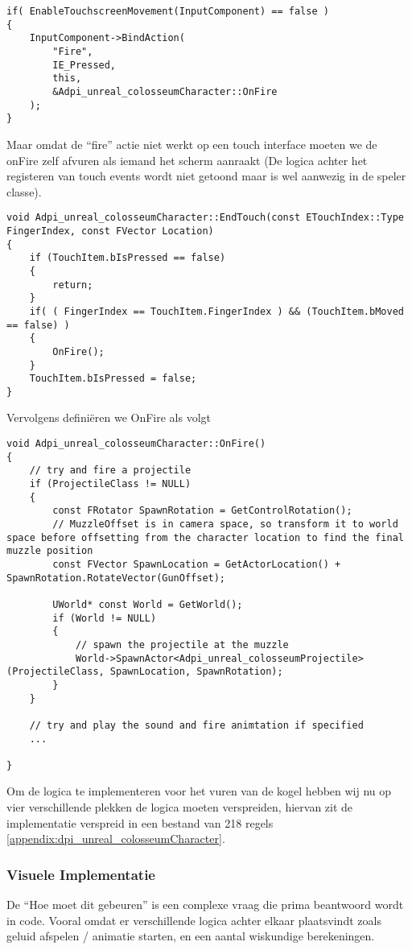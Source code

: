 \begin{lstlisting}[caption=Koppellen van de Fire actie aan de OndFire functie]
if( EnableTouchscreenMovement(InputComponent) == false )
{
	InputComponent->BindAction(
		"Fire", 
		IE_Pressed, 
		this, 
		&Adpi_unreal_colosseumCharacter::OnFire
	);
}
\end{lstlisting}
Maar omdat de “fire” actie niet werkt op een touch interface moeten we de onFire zelf afvuren als iemand het scherm aanraakt (De logica achter het registeren van touch events wordt niet getoond maar is wel aanwezig in de speler classe).

\begin{lstlisting}[caption=Aanroepen van de OnFire functie tijdens het EndTouch event]
void Adpi_unreal_colosseumCharacter::EndTouch(const ETouchIndex::Type FingerIndex, const FVector Location)
{
	if (TouchItem.bIsPressed == false)
	{
		return;
	}
	if( ( FingerIndex == TouchItem.FingerIndex ) && (TouchItem.bMoved == false) )
	{
		OnFire();
	}
	TouchItem.bIsPressed = false;
}
\end{lstlisting}
Vervolgens definiëren we OnFire als volgt

\begin{lstlisting}[caption=Implementatie van de OnFire functie]
void Adpi_unreal_colosseumCharacter::OnFire()
{ 
	// try and fire a projectile
	if (ProjectileClass != NULL)
	{
		const FRotator SpawnRotation = GetControlRotation();
		// MuzzleOffset is in camera space, so transform it to world space before offsetting from the character location to find the final muzzle position
		const FVector SpawnLocation = GetActorLocation() + SpawnRotation.RotateVector(GunOffset);

		UWorld* const World = GetWorld();
		if (World != NULL)
		{
			// spawn the projectile at the muzzle
			World->SpawnActor<Adpi_unreal_colosseumProjectile>(ProjectileClass, SpawnLocation, SpawnRotation);
		}
	}

	// try and play the sound and fire animtation if specified
	...

}
\end{lstlisting}
Om de logica te implementeren voor het vuren van de kogel hebben wij nu op vier verschillende plekken de logica moeten verspreiden, hiervan zit de implementatie verspreid in een bestand van 218 regels \ref{appendix:dpi_unreal_colosseumCharacter}.

\subsubsection{Visuele Implementatie}
De “Hoe moet dit gebeuren” is een complexe vraag die prima beantwoord wordt in code. Vooral omdat er verschillende logica achter elkaar plaatsvindt zoals geluid afspelen / animatie starten, en een aantal wiskundige berekeningen. 

